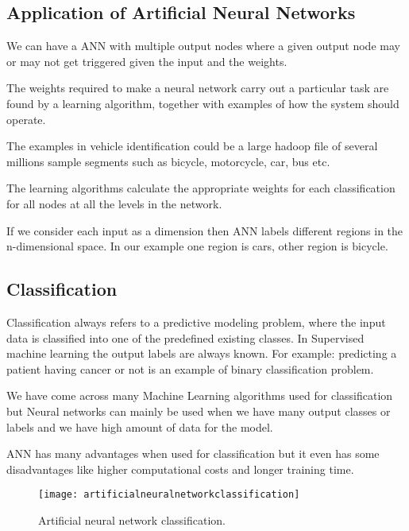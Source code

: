 	\subsection{Application of Artificial Neural Networks}

	\begin{bulletedlist}
		\item We can have a ANN with multiple output nodes where a given output node may or may not get triggered given the input and the weights.
		\item The weights required to make a neural network carry out a particular task are found by a learning algorithm, together with  examples of how the system  should operate.
		\item The examples in vehicle identification could be a large hadoop file of several millions sample segments such as bicycle, motorcycle, car, bus etc.
		\item The learning algorithms calculate the appropriate weights for each classification for all nodes at all the levels in the network.
		\item If we consider each input as a dimension then ANN labels different regions in the n-dimensional space. In our example one region is cars, other region is bicycle.
	\end{bulletedlist}

	\subsection{Classification}
	\begin{bulletedlist}
		\item Classification always refers to a predictive modeling problem, where the input data is classified into one of the predefined existing classes. In Supervised machine learning the output labels are always known. For example: predicting a patient having cancer or not is an example of binary classification problem.
		\item We have come across many Machine Learning algorithms used for classification but Neural networks can mainly be used when we have many output classes or labels and we have high amount of data for the model.
		\item ANN has many advantages when used for classification but it even has some disadvantages like higher computational costs and longer training time.
	\end{bulletedlist}

 	\begin{figure}[h]
		\centering
		\texttt{[image: artificialneuralnetworkclassification]}
		\caption[Artificial neural network classification]{Artificial neural network classification.}
		\label{fig:artificialneuralnetworkclassification}
	\end{figure}

